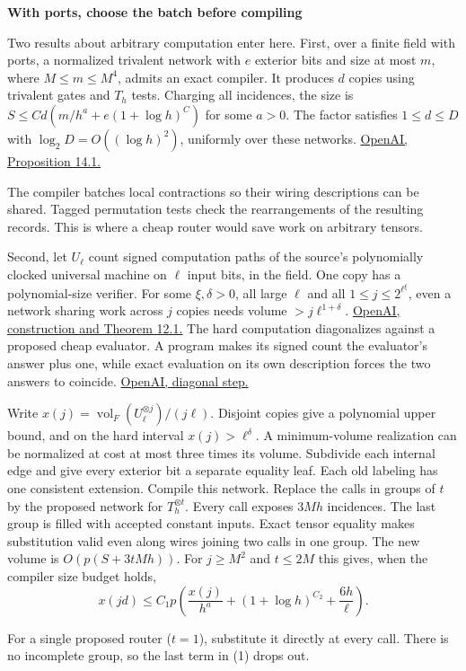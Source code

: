 \documentclass[11pt,letterpaper]{article}
\newcommand{\heading}[1]{{\noindent\LARGE\bfseries #1\par}\vspace{2pt}}
\newcommand{\vol}{\operatorname{vol}}
\newcommand{\Tag}{T}
\newcommand{\paperpath}{https://github.com/openai/math/blob/3344da59991ed94f9ba711217b29c1d760badfa6/preprints}
\newcommand{\geomref}[2]{\href{\paperpath/Euclidean-geometry-in-the-asymptotic-spectrum-of-tensors-November-24-2026/build/#1}{#2}}
\newcommand{\permref}[2]{\href{\paperpath/Circuit-lower-bounds-for-Hamiltonian-cycle-and-the-permanent-November-24-2026/build/#1}{#2}}
\begin{document}
\newpage
\heading{With ports, choose the batch before compiling}
Two results about arbitrary computation enter here. First, over a finite
field with ports, a normalized trivalent network with \(e\) exterior bits
and size at most \(m\), where \(M\le m\le M^4\), admits an exact compiler.
It produces \(d\) copies using trivalent gates and \(\Tag_h\) tests. Charging
all incidences, the size is \(S\le C d(m/h^a+e(1+\log h)^C)\) for some
\(a>0\). The factor satisfies \(1\le d\le D\) with
\(\log_2 D=O((\log h)^2)\), uniformly over these networks.
\geomref{exact.tex\#L11-L31}{OpenAI, Proposition 14.1.}

The compiler batches local contractions so their wiring descriptions can be
shared. Tagged permutation tests check the rearrangements of the resulting
records. This is where a cheap router would save work on arbitrary tensors.

Second, let \(U_\ell\) count signed computation paths of the source's
polynomially clocked universal machine on \(\ell\) input bits, in the
field. One copy has a polynomial-size verifier. For some \(\xi,\delta>0\),
all large \(\ell\) and all \(1\le j\le 2^{\ell^\xi}\), even a network
sharing work across \(j\) copies needs volume \(>j\ell^{1+\delta}\).
\permref{model.tex\#L21-L87}{OpenAI, construction and Theorem 12.1.}
The hard computation diagonalizes against a proposed cheap evaluator. A
program makes its signed count the evaluator's answer plus one, while exact
evaluation on its own description forces the two answers to coincide.
\permref{batch.tex\#L66-L89}{OpenAI, diagonal step.}

Write \(x(j)=\vol_F(U_\ell^{\otimes j})/(j\ell)\). Disjoint copies give a
polynomial upper bound, and on the hard interval \(x(j)>\ell^\delta\).
A minimum-volume realization can be normalized at cost at most three times
its volume. Subdivide each internal edge and give every exterior bit a separate
equality leaf. Each old labeling has one consistent extension. Compile this network. Replace the calls in
groups of \(t\) by the proposed network for \(\Tag_h^{\otimes t}\).
Every call exposes \(3Mh\) incidences. The last group is filled with
accepted constant inputs. Exact tensor equality makes substitution valid
even along wires joining two calls in one group. The new volume is
\(O(p(S+3tMh))\). For \(j\ge M^2\) and \(t\le2M\) this gives, when the
compiler size budget holds,
\[
 x(jd)\le C_1p\left(\frac{x(j)}{h^a}+(1+\log h)^{C_2}+\frac{6h}{\ell}\right). \tag{1}
\]

For a single proposed router (\(t=1\)), substitute it directly at every call.
There is no incomplete group, so the last term in (1) drops out.
\end{document}
